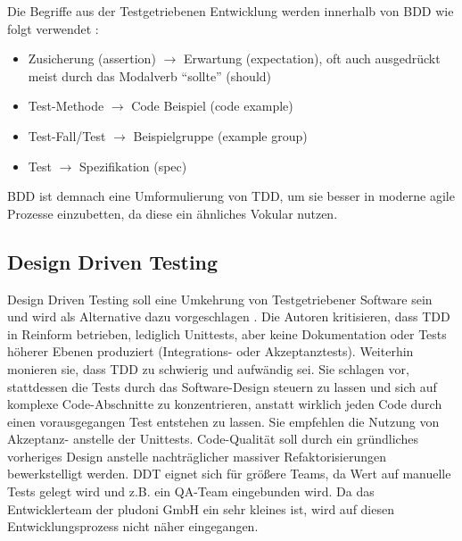 Die Begriffe aus der Testgetriebenen Entwicklung werden innerhalb von BDD wie folgt verwendet \citep[S. 151]{chelimsky_rspec_2010}:
\begin{itemize}
 \item Zusicherung (assertion) $\to$ Erwartung (expectation), oft auch ausgedrückt meist durch das Modalverb "`sollte"' (should)
 \item Test-Methode $\to$ Code Beispiel (code example)
 \item Test-Fall/Test $\to$ Beispielgruppe (example group)
 \item Test $\to$ Spezifikation (spec)
\end{itemize}
BDD ist demnach eine Umformulierung von TDD, um sie besser in moderne agile Prozesse einzubetten, da diese ein ähnliches Vokular nutzen.

\subsection{Design Driven Testing}
Design Driven Testing soll eine Umkehrung von Testgetriebener Software sein und wird als Alternative dazu vorgeschlagen \citep{stephens_design_2010}. Die Autoren kritisieren, dass TDD in Reinform betrieben, lediglich Unittests, aber keine Dokumentation oder Tests höherer Ebenen produziert (Integrations- oder Akzeptanztests). Weiterhin monieren sie, dass TDD zu schwierig und aufwändig sei. Sie schlagen vor, stattdessen die Tests durch das Software-Design steuern zu lassen und sich auf komplexe Code-Abschnitte zu konzentrieren, anstatt wirklich jeden Code durch einen vorausgegangen Test entstehen zu lassen. Sie empfehlen die Nutzung von Akzeptanz- anstelle der Unittests. Code-Qualität soll durch ein gründliches vorheriges Design anstelle nachträglicher massiver Refaktorisierungen bewerkstelligt werden.
DDT eignet sich für größere Teams, da Wert auf manuelle Tests gelegt wird und z.B. ein QA-Team eingebunden wird. Da das Entwicklerteam der pludoni GmbH ein sehr kleines ist, wird auf diesen Entwicklungsprozess nicht näher eingegangen.
